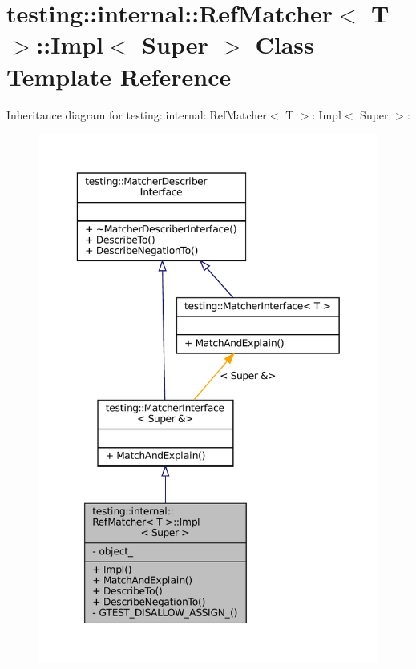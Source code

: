 \hypertarget{classtesting_1_1internal_1_1RefMatcher_3_01T_01_6_01_4_1_1Impl}{}\section{testing\+:\+:internal\+:\+:Ref\+Matcher$<$ T $>$\+:\+:Impl$<$ Super $>$ Class Template Reference}
\label{classtesting_1_1internal_1_1RefMatcher_3_01T_01_6_01_4_1_1Impl}


Inheritance diagram for testing\+:\+:internal\+:\+:Ref\+Matcher$<$ T $>$\+:\+:Impl$<$ Super $>$\+:
\nopagebreak
\begin{figure}[H]
\begin{center}
\leavevmode
\includegraphics[width=349pt]{classtesting_1_1internal_1_1RefMatcher_3_01T_01_6_01_4_1_1Impl__inherit__graph}
\end{center}
\end{figure}


